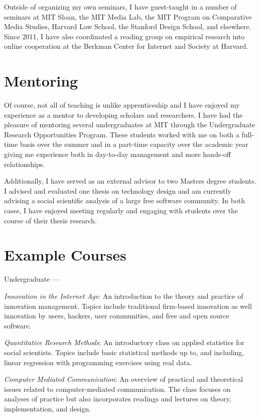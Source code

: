\documentclass[10pt]{memoir}
\newenvironment{enumerate*}%
  {\begin{enumerate}%
    \setlength{\itemsep}{0pt}%
    \setlength{\parskip}{0pt}}%
  {\end{enumerate}}
\begin{document}
Outside of organizing my own seminars, I have guest-taught in a number
of seminars at MIT Sloan, the MIT Media Lab, the MIT Program on
Comparative Media Studies, Harvard Law School, the Stanford Design
School, and elsewhere. Since 2011, I have also coordinated a reading
group on empirical research into online cooperation at the Berkman
Center for Internet and Society at Harvard.

\section{Mentoring}

Of course, not all of teaching is unlike apprenticeship and I have
enjoyed my experience as a mentor to developing scholars and
researchers. I have had the pleasure of mentoring several
undergraduates at MIT through the Undergraduate Research Opportunities
Program. These students worked with me on both a full-time basis over
the summer and in a part-time capacity over the academic year giving
me experience both in day-to-day management and more hands-off
relationships.

Additionally, I have served as an external advisor to two Masters
degree students. I advised and evaluated one thesis on technology
design and am currently advising a social scientific analysis of a
large free software community. In both cases, I have enjoyed meeting
regularly and engaging with students over the course of their thesis
research.

\section{Example Courses}

Undergraduate ---

\begin{enumerate*}
\item \emph{Innovation in the Internet Age}: An introduction to the
  theory and practice of innovation management. Topics include
  traditional firm-based innovation as well innovation by users,
  hackers, user communities, and free and open source software.
\item \emph{Quantitative Research Methods}: An introductory class on
  applied statistics for social scientists. Topics include basic
  statistical methods up to, and including, linear regression with
  programming exercises using real data.
\item \emph{Computer Mediated Communication}: An overview of practical
  and theoretical issues related to computer-mediated
  communication. The class focuses on analyses of practice but also
  incorporates readings and lectures on theory, implementation, and
  design.
\end{enumerate*}
\end{document}
